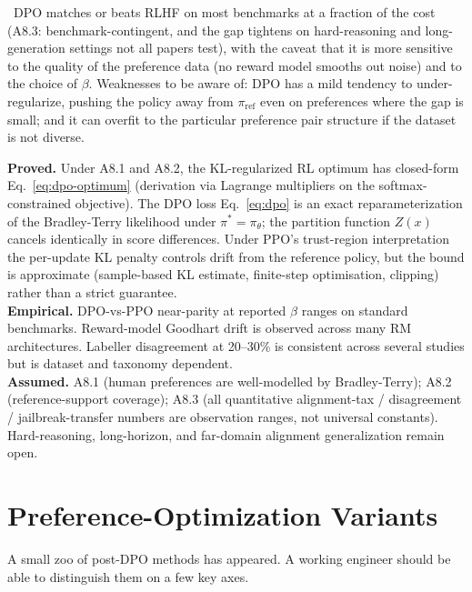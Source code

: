 \Emp\ DPO matches or beats RLHF on most benchmarks at a fraction of
the cost (A8.3: benchmark-contingent, and the gap tightens on
hard-reasoning and long-generation settings not all papers test),
with the caveat that it is more sensitive to the quality of the
preference data (no reward model smooths out noise) and to the
choice of $\beta$. Weaknesses to be aware of: DPO has a mild
tendency to under-regularize, pushing the policy away from
$\pi_\text{ref}$ even on preferences where the gap is small; and it
can overfit to the particular preference pair structure if the
dataset is not diverse.

\begin{provedassumed}
\textbf{Proved.} Under A8.1 and A8.2, the KL-regularized RL optimum
has closed-form Eq.~\eqref{eq:dpo-optimum} (derivation via Lagrange
multipliers on the softmax-constrained objective). The DPO loss
Eq.~\eqref{eq:dpo} is an exact reparameterization of the
Bradley-Terry likelihood under $\pi^* = \pi_\theta$; the partition
function $Z(x)$ cancels identically in score differences. Under
PPO's trust-region interpretation the per-update KL penalty
controls drift from the reference policy, but the bound is
approximate (sample-based KL estimate, finite-step optimisation,
clipping) rather than a strict guarantee.\\
\textbf{Empirical.} DPO-vs-PPO near-parity
\citep{rafailov2023direct} at reported $\beta$ ranges on standard
benchmarks. Reward-model Goodhart drift \citep{gao2023scaling} is
observed across many RM architectures. Labeller disagreement at
20--30\% is consistent across several studies but is dataset and
taxonomy dependent.\\
\textbf{Assumed.} A8.1 (human preferences are well-modelled by
Bradley-Terry); A8.2 (reference-support coverage); A8.3 (all
quantitative alignment-tax / disagreement / jailbreak-transfer
numbers are observation ranges, not universal constants).
Hard-reasoning, long-horizon, and far-domain alignment
generalization remain open.
\end{provedassumed}

\section{Preference-Optimization Variants}

A small zoo of post-DPO methods has appeared. A working engineer
should be able to distinguish them on a few key axes.

